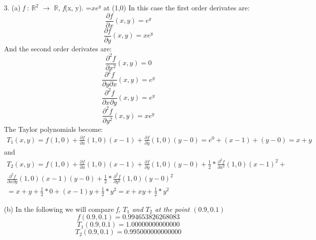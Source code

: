 \documentclass[a4paper,12pt]{article}
\begin{document}
\clearpage %
3. (a) \emph{f} : $\mathbb{R}^2$ $\to$  $\mathbb{R}$, \emph{f}(x, y). 
=$xe^y$ at (1,0)  \newline
In this case the first order derivates are: 
\begin{equation*}
\frac{\partial f}{\partial x}(x, y) = e^y
\end{equation*}
\begin{equation*}
\frac{\partial f}{\partial y}(x, y) = xe^y
\end{equation*}
And the second order derivates are:
\begin{equation*}
\frac{\partial^2 f}{\partial x^2}(x, y) = 0
\end{equation*}
\begin{equation*}
\frac{\partial^2 f}{\partial y\partial x}(x, y) = e^y
\end{equation*}
\begin{equation*}
\frac{\partial^2 f}{\partial x\partial y}(x, y) = e^y
\end{equation*}
\begin{equation*}
\frac{\partial^2 f}{\partial y^2}(x, y) =  xe^y
\end{equation*} \newline
The Taylor polynomials become:
\begin{multline*}
T_{1}(x,y) =  f(1,0) + \frac{\partial f}{\partial x}(1, 0)(x - 1)
+ \frac{\partial f}{\partial y}(1, 0)(y - 0)
=  e^0 + (x - 1) + (y - 0) = x + y
\end{multline*}
and
\begin{multline*}
T_{2}(x,y) = f(1, 0) + 
	\frac{\partial f}{\partial x}(1, 0)(x - 1) + 
	\frac{\partial f}{\partial y}(1, 0)(y - 0) + 
	\frac{1}{2} * \frac{\partial^2 f}{\partial x^2}(1, 0)(x - 1)^2  + \\
	\frac{\partial^2 f}{\partial x\partial y}(1, 0)(x - 1)(y - 0) +
	\frac{1}{2} * \frac{\partial^2 f}{\partial y^2}(1, 0)(y - 0)^2  \\
= x + y + \frac{1}{2} * 0 + (x - 1)y + \frac{1}{2} * y^2 = x + xy + \frac{1}{2} * y^2
\end{multline*}

(b) In the following we will compare \em{f}, \em{$T_{1}$} and \em{$T_{2}$} at the point $(0.9, 0.1)$
\begin{equation*}
f(0.9, 0.1) = 0.994653826268083
\end{equation*}
\begin{equation*}
T_{1}(0.9, 0.1) = 1.00000000000000
\end{equation*}
\begin{equation*}
T_{2}(0.9, 0.1) = 0.995000000000000
\end{equation*}
\end{document}

